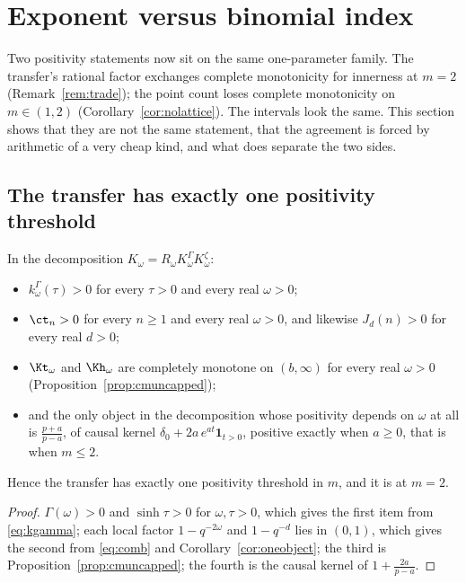 \section{Exponent versus binomial index}\label{sec:position}

Two positivity statements now sit on the same one-parameter family. The
transfer's rational factor exchanges complete monotonicity for innerness at
$m=2$ (Remark~\ref{rem:trade}); the point count loses complete monotonicity on
$m\in(1,2)$ (Corollary~\ref{cor:nolattice}). The intervals look the same. This
section shows that they are not the same statement, that the agreement is forced
by arithmetic of a very cheap kind, and what does separate the two sides.

\subsection{The transfer has exactly one positivity threshold}\label{sec:onethreshold}

\begin{proposition}[One threshold, at $m=2$]\label{prop:onethreshold}
In the decomposition $K_\omega=R_\omega K^\Gamma_\omega K^\zeta_\omega$:
\begin{itemize}
\item $k^\Gamma_\omega(\tau)>0$ for every $\tau>0$ and every real $\omega>0$;
\item $\ct_n>0$ for every $n\ge1$ and every real $\omega>0$, and likewise
 $J_d(n)>0$ for every real $d>0$;
\item $\Kt_\omega$ and $\Kh_\omega$ are completely monotone on $(b,\infty)$ for
 every real $\omega>0$ (Proposition~\ref{prop:cmuncapped});
\item and the only object in the decomposition whose positivity depends on
 $\omega$ at all is $\frac{p+a}{p-a}$, of causal kernel
 $\delta_0+2a\,e^{at}\mathbf 1_{t>0}$, positive exactly when $a\ge0$, that is
 when $m\le2$.
\end{itemize}
Hence the transfer has exactly one positivity threshold in $m$, and it is at
$m=2$.
\end{proposition}

\begin{proof}
$\Gamma(\omega)>0$ and $\sinh\tau>0$ for $\omega,\tau>0$, which gives the first
item from \eqref{eq:kgamma}; each local factor $1-q^{-2\omega}$ and $1-q^{-d}$
lies in $(0,1)$, which gives the second from \eqref{eq:comb} and
Corollary~\ref{cor:oneobject}; the third is
Proposition~\ref{prop:cmuncapped}; the fourth is the causal kernel of
$1+\frac{2a}{p-a}$.
\end{proof}

